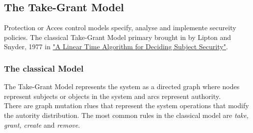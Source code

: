 \documentclass[pdftex,11pt,a4paper]{article}
\begin{document}
	\newpage
	\subsection{The Take-Grant Model}	
	Protection or Acces control models specify, analyse and implemente secureity policies. 
	The classical Take-Grant Model primary brought in by Lipton and Snyder, 1977 in  \href{https://www.cs.nmt.edu/~doshin/t/s06/cs589/pub/2.JLS-TG.pdf}{%
		"A Linear Time Algorithm for Deciding Subject Security"}.
	\subsubsection{The classical Model}
	The Take-Grant Model \cite{TakeG} represents the system as a directed graph where nodes represent subjects or objects in the system and arcs represent authority. \\ 
	There are graph mutation rlues that represent the system operations that modify the autority distribution.
	The most common rules in the classical model are \textit{take, grant, create} and \textit{remove}. 
	
\end{document}
